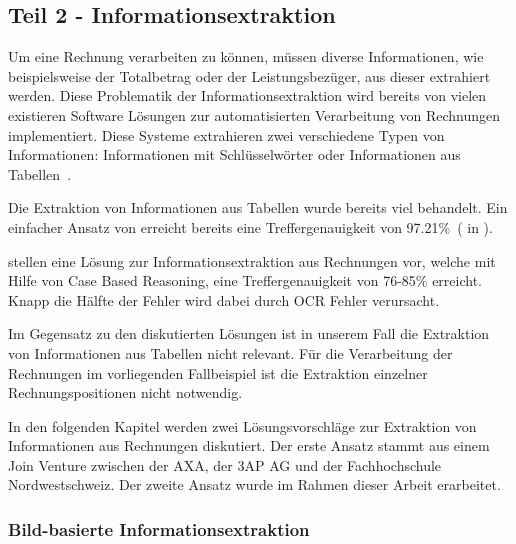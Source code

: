 \subsection{Teil 2 - Informationsextraktion}



Um eine Rechnung verarbeiten zu können, müssen diverse Informationen, wie beispielsweise der Totalbetrag oder der Leistungsbezüger, aus dieser extrahiert werden. Diese Problematik der Informationsextraktion wird bereits von vielen existieren Software Lösungen zur automatisierten Verarbeitung von Rechnungen implementiert. Diese Systeme extrahieren zwei verschiedene Typen von Informationen: Informationen mit Schlüsselwörter oder Informationen aus Tabellen~\autocite{Hamza}.

Die Extraktion von Informationen aus Tabellen wurde bereits viel behandelt. Ein einfacher Ansatz von \textcite{Mandal} erreicht bereits eine Treffergenauigkeit von 97.21\%~(\cite{Mandal} in \cite{Hamza}).

\textcite{Hamza} stellen eine Lösung zur Informationsextraktion aus Rechnungen vor, welche mit Hilfe von Case Based Reasoning, eine Treffergenauigkeit von 76-85\% erreicht. Knapp die Hälfte der Fehler wird dabei durch OCR Fehler verursacht.

Im Gegensatz zu den diskutierten Lösungen ist in unserem Fall die Extraktion von Informationen aus Tabellen nicht relevant. Für die Verarbeitung der Rechnungen im vorliegenden Fallbeispiel ist die Extraktion einzelner Rechnungspositionen nicht notwendig.

In den folgenden Kapitel werden zwei Lösungsvorschläge zur Extraktion von Informationen aus Rechnungen diskutiert. Der erste Ansatz stammt aus einem Join Venture zwischen der AXA, der 3AP AG und der Fachhochschule Nordwestschweiz. Der zweite Ansatz wurde im Rahmen dieser Arbeit erarbeitet.


\subsubsection{Bild-basierte Informationsextraktion}

